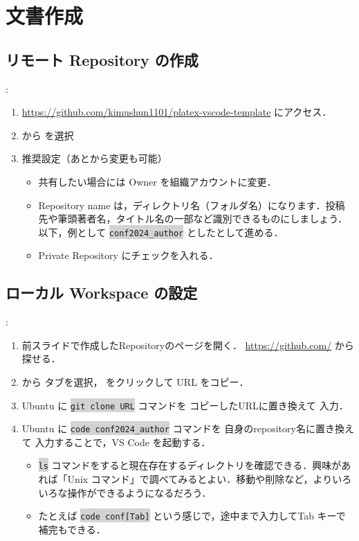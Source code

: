 \documentclass[aspectratio=169,dvipdfmx,cjk]{beamer}
\newcommand{\cmdline}[1]{
    \colorbox{lightgray}{\lstinline[style=command]{#1}}
}
\newcommand{\blue}[1]{ {\color{blue} #1} }
\begin{document}
\section{文書作成}
\subsection{リモート Repository の作成}
\begin{frame}{\insertsection \thesubsection: \insertsubsection}
  \begin{enumerate}
    \item \href{https://github.com/kimushun1101/platex-vscode-template}{https://github.com/kimushun1101/platex-vscode-template} にアクセス．
    \item {} から  を選択
    \item 推奨設定（あとから変更も可能）
    \begin{itemize}
      \item 共有したい場合には Owner を組織アカウントに変更．
      \item Repository name は，ディレクトリ名（フォルダ名）になります．投稿先や筆頭著者名，タイトル名の一部など識別できるものにしましょう．\\
      以下，例として \cmdline{conf2024_author} としたとして進める．
      \item Private Repository にチェックを入れる．
    \end{itemize}
  \end{enumerate}
\end{frame}

\subsection{ローカル Workspace の設定}
\begin{frame}{\insertsection \thesubsection: \insertsubsection}
  \begin{enumerate}
    \item 前スライドで作成したRepositoryのページを開く．
    \href{https://github.com/}{https://github.com/} から探せる．
    \item {} から  タブを選択， をクリックして URL をコピー．
    \item Ubuntu に \cmdline{git clone URL} コマンドを\blue{コピーしたURLに置き換えて}入力．
    \item Ubuntu に \cmdline{code conf2024_author} コマンドを\blue{自身のrepository名に置き換えて}入力することで，VS Code を起動する．
    \begin{itemize}
      \item \cmdline{ls} コマンドをすると現在存在するディレクトリを確認できる．興味があれば「Unix コマンド」で調べてみるとよい．移動や削除など，よりいろいろな操作ができるようになるだろう．
      \item たとえば \cmdline{code conf[Tab]} という感じで，途中まで入力してTab キーで補完もできる．
    \end{itemize}
  \end{enumerate}
\end{frame}
\end{document}
